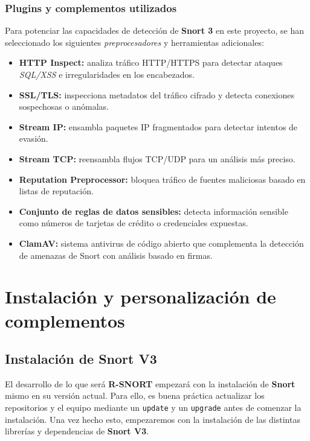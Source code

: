 \documentclass[11pt,a4paper,twoside]{report}
\begin{document}
\subsubsection{Plugins y complementos utilizados}
Para potenciar las capacidades de detección de \textbf{Snort 3} en este proyecto, se han seleccionado los siguientes \textit{preprocesadores} y herramientas adicionales:

\begin{itemize}
	\item \textbf{HTTP Inspect:} analiza tráfico HTTP/HTTPS para detectar ataques \textit{SQL/XSS} e irregularidades en los encabezados.
	\item \textbf{SSL/TLS:} inspecciona metadatos del tráfico cifrado y detecta conexiones sospechosas o anómalas.
	\item \textbf{Stream IP:} ensambla paquetes IP fragmentados para detectar intentos de evasión.
	\item \textbf{Stream TCP:} reensambla flujos TCP/UDP para un análisis más preciso.
	\item \textbf{Reputation Preprocessor:} bloquea tráfico de fuentes maliciosas basado en listas de reputación. 
	\item \textbf{Conjunto de reglas de datos sensibles:} detecta información sensible como números de tarjetas de crédito o credenciales expuestas.
	\item \textbf{ClamAV:} sistema antivirus de código abierto que complementa la detección de amenazas de Snort con análisis basado en firmas.
\end{itemize}


\newpage

\section{Instalación y personalización de complementos}
\subsection{Instalación de Snort V3}
El desarrollo de lo que será \textbf{R-SNORT} empezará con la instalación de \textbf{Snort} \cite{snort3_installation_pdf} mismo en su versión actual. Para ello, es buena práctica actualizar los repositorios y el equipo mediante un \texttt{update} y un \texttt{upgrade} antes de comenzar la instalación. Una vez hecho esto, empezaremos con la instalación de las distintas librerías y dependencias de \textbf{Snort V3}.
\newline
\end{document}
